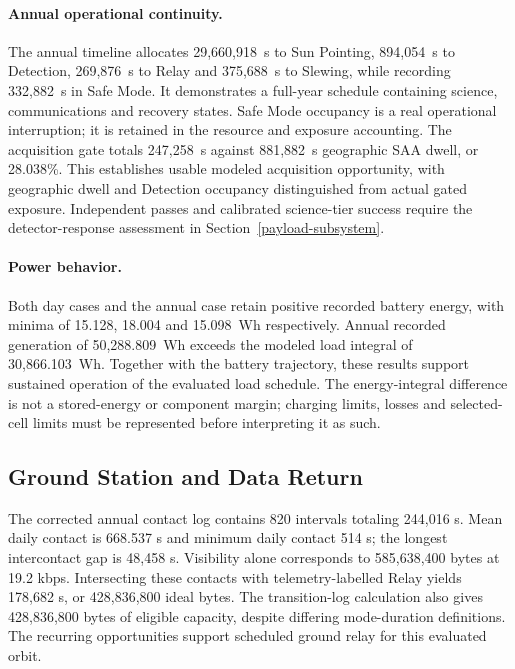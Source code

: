 \paragraph{Annual operational continuity.} The annual timeline allocates 29,660,918~s to Sun Pointing, 894,054~s to Detection, 269,876~s to Relay and 375,688~s to Slewing, while recording 332,882~s in Safe Mode. It demonstrates a full-year schedule containing science, communications and recovery states. Safe Mode occupancy is a real operational interruption; it is retained in the resource and exposure accounting. The acquisition gate totals 247,258~s against 881,882~s geographic SAA dwell, or 28.038\%. This establishes usable modeled acquisition opportunity, with geographic dwell and Detection occupancy distinguished from actual gated exposure. Independent passes and calibrated science-tier success require the detector-response assessment in Section~\ref{payload-subsystem}.

\paragraph{Power behavior.} Both day cases and the annual case retain positive recorded battery energy, with minima of 15.128, 18.004 and 15.098~Wh respectively. Annual recorded generation of 50,288.809~Wh exceeds the modeled load integral of 30,866.103~Wh. Together with the battery trajectory, these results support sustained operation of the evaluated load schedule. The energy-integral difference is not a stored-energy or component margin; charging limits, losses and selected-cell limits must be represented before interpreting it as such.

\subsection{Ground Station and Data Return}\label{sec:sim-coverage}
The corrected annual contact log contains 820 intervals totaling 244,016 s. Mean daily contact is 668.537 s and minimum daily contact 514 s; the longest intercontact gap is 48,458 s. Visibility alone corresponds to 585,638,400 bytes at 19.2 kbps. Intersecting these contacts with telemetry-labelled Relay yields 178,682 s, or 428,836,800 ideal bytes. The transition-log calculation also gives 428,836,800 bytes of eligible capacity, despite differing mode-duration definitions. The recurring opportunities support scheduled ground relay for this evaluated orbit.

